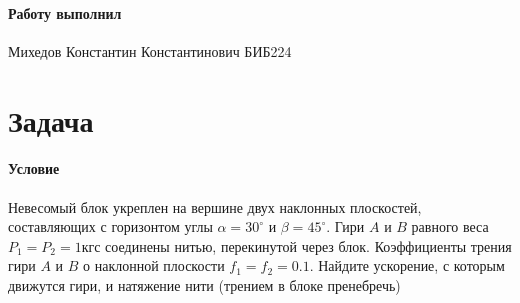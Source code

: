 \documentclass[a4paper,12pt]{article}
\begin{document}
    \paragraph{Работу выполнил} Михедов Константин Константинович БИБ224

    \section*{Задача }
 
    \paragraph{Условие} Невесомый блок укреплен на вершине двух наклонных плоскостей, составляющих с горизонтом углы
    $\alpha = 30^{\circ}$ и $\beta = 45^{\circ}$. Гири $A$ и $B$ равного веса $P_1 = P_2 = 1$кгс соединены нитью,
    перекинутой через блок. Коэффициенты трения гири $A$ и $B$ о наклонной плоскости $f_1 = f_2 = 0.1$. Найдите
    ускорение, с которым движутся гири, и натяжение нити (трением в блоке пренебречь)
\end{document}
